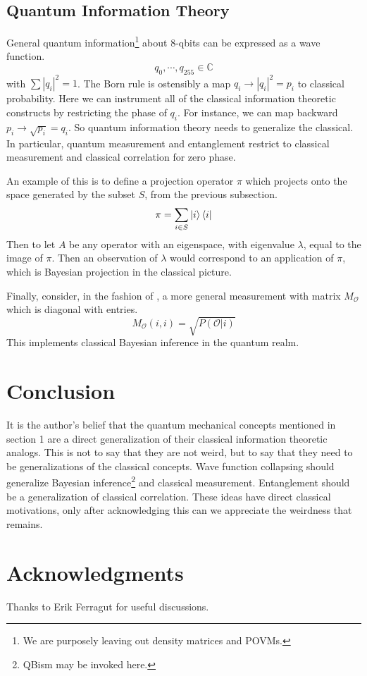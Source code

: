 \documentclass[12pt,a4paper]{article}
\begin{document}
\subsection{Quantum Information Theory}
General quantum information\footnote{We are purposely leaving out density matrices and POVMs.} about 8-qbits can be expressed as a wave function.
\[
   q_0,\cdots,q_{255} \in \mathbb{C}
\]
with $\sum |q_i|^2 = 1$.  The Born rule is ostensibly a map $q_i \rightarrow |q_i|^2 = p_i$ to classical probability.  Here we can instrument all of the classical information theoretic constructs by restricting the phase of $q_i$.  For instance, we can map backward $p_i \rightarrow \sqrt{p_i} = q_i$.  So quantum information theory needs to generalize the classical.  In particular, quantum measurement and entanglement restrict to classical measurement and classical correlation for zero phase.

An example of this is to define a projection operator $\pi$ which projects onto the space generated by the subset $S$, from the previous subsection.
\[
\pi = \sum_{i \in S} \ket{i} \bra{i}
\]
Then to let $A$ be any operator with an eigenspace, with eigenvalue $\lambda$, equal to the image of $\pi$.  Then an observation of $\lambda$ would correspond to an application of $\pi$, which is Bayesian projection in the classical picture.

Finally, consider, in the fashion of \cite{nielsenchuang}, a more general measurement with matrix $M_\mathcal{O}$ which is diagonal with entries.
\[
   M_\mathcal{O}(i,i) = \sqrt{P(\mathcal{O} | i)}
\]
This implements classical Bayesian inference in the quantum realm.
   
\section{Conclusion}

It is the author's belief that the quantum mechanical concepts mentioned in section 1 are a direct generalization of their classical information theoretic analogs.  This is not to say that they are not weird, but to say that they need to be generalizations of the classical concepts.  Wave function collapsing should generalize Bayesian inference\footnote{QBism may be invoked here.} and classical measurement.  Entanglement should be a generalization of classical correlation.  These ideas have direct classical motivations, only after acknowledging this can we appreciate the weirdness that remains.

\section{Acknowledgments}
Thanks to Erik Ferragut for useful discussions.



\end{document}

